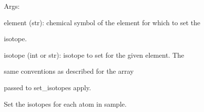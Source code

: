 \documentclass[letterpaper,10pt,english]{sphinxmanual}
\begin{document}
\begin{fulllineitems}
\begin{fulllineitems}
\begin{DUlineblock}{0em}
\item[] Args:
\item[]
\begin{DUlineblock}{\DUlineblockindent}
\item[] element (str): chemical symbol of the element for which to set the
\item[]
\begin{DUlineblock}{\DUlineblockindent}
\item[] isotope.
\end{DUlineblock}
\item[] isotope (int or str): isotope to set for the given element. The
\item[]
\begin{DUlineblock}{\DUlineblockindent}
\item[] same conventions as described for the array
\item[] passed to set\_isotopes apply.
\end{DUlineblock}
\end{DUlineblock}
\end{DUlineblock}

\end{fulllineitems}


\begin{fulllineitems}
\label{doctree/soprano.calculate.nmr.nmr:soprano.calculate.nmr.nmr.NMRCalculator.set_isotopes}
Set the isotopes for each atom in sample.


\end{fulllineitems}
\end{fulllineitems}
\end{document}
